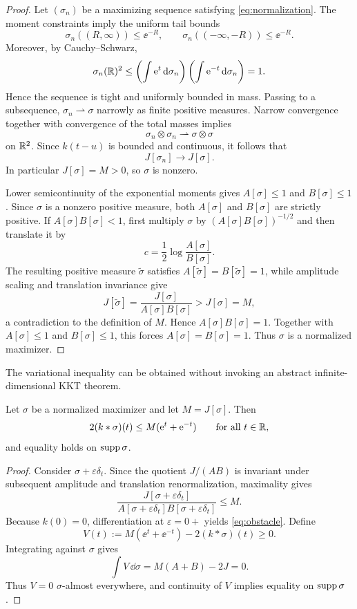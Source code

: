 \begin{proof}
Let $(\sigma_n)$ be a maximizing sequence satisfying \eqref{eq:normalization}.  The moment constraints imply the uniform tail bounds
\[
 \sigma_n((R,\infty))\le \ee^{-R},
 \qquad
 \sigma_n(( -\infty,-R))\le \ee^{-R}.
\]
Moreover, by Cauchy--Schwarz,
\[
 \sigma_n(\mathbb{R})^2
 \le\left(\int\mathrm{e}^t\,\mathrm{d}\sigma_n\right)
 \left(\int\mathrm{e}^{-t}\,\mathrm{d}\sigma_n\right)=1.
\]
Hence the sequence is tight and uniformly bounded in mass.  Passing to a subsequence, $\sigma_n\rightharpoonup\sigma$ narrowly as finite positive measures.  Narrow convergence together with convergence of the total masses implies
\[
 \sigma_n\otimes\sigma_n\rightharpoonup\sigma\otimes\sigma
\]
on $\mathbb{R}^2$.  Since $k(t-u)$ is bounded and continuous, it follows that
\[
 J[\sigma_n]\longrightarrow J[\sigma].
\]
In particular $J[\sigma]=M>0$, so $\sigma$ is nonzero.

Lower semicontinuity of the exponential moments gives $A[\sigma]\le1$ and $B[\sigma]\le1$.  Since $\sigma$ is a nonzero positive measure, both $A[\sigma]$ and $B[\sigma]$ are strictly positive.  If $A[\sigma]B[\sigma]<1$, first multiply $\sigma$ by $(A[\sigma]B[\sigma])^{-1/2}$ and then translate it by
\[
 c=\frac12\log\frac{A[\sigma]}{B[\sigma]}.
\]
The resulting positive measure $\widetilde\sigma$ satisfies $A[\widetilde\sigma]=B[\widetilde\sigma]=1$, while amplitude scaling and translation invariance give
\[
 J[\widetilde\sigma]
 =\frac{J[\sigma]}{A[\sigma]B[\sigma]}
 >J[\sigma]=M,
\]
a contradiction to the definition of $M$.  Hence $A[\sigma]B[\sigma]=1$.  Together with $A[\sigma]\le1$ and $B[\sigma]\le1$, this forces $A[\sigma]=B[\sigma]=1$.  Thus $\sigma$ is a normalized maximizer.
\end{proof}

The variational inequality can be obtained without invoking an abstract infinite-dimensional KKT theorem.

\begin{lemma}
Let $\sigma$ be a normalized maximizer and let $M=J[\sigma]$.  Then
\begin{equation}\label{eq:obstacle}
 2(k*\sigma)(t)\le M(\mathrm{e}^t+\mathrm{e}^{-t})
 \qquad\text{for all }t\in\mathbb{R},
\end{equation}
and equality holds on $\operatorname{supp}\sigma$.
\end{lemma}

\begin{proof}
Consider $\sigma+\varepsilon\delta_t$.  Since the quotient $J/(AB)$ is invariant under subsequent amplitude and translation renormalization, maximality gives
\[
 \frac{J[\sigma+\varepsilon\delta_t]}
 {A[\sigma+\varepsilon\delta_t]B[\sigma+\varepsilon\delta_t]}
 \le M.
\]
Because $k(0)=0$, differentiation at $\varepsilon=0+$ yields \eqref{eq:obstacle}.  Define
\[
 V(t):=M(\ee^t+\ee^{-t})-2(k*\sigma)(t)\ge0.
\]
Integrating against $\sigma$ gives
\[
 \int V\,\dd\sigma=M(A+B)-2J=0.
\]
Thus $V=0$ $\sigma$-almost everywhere, and continuity of $V$ implies equality on $\operatorname{supp}\sigma$.
\end{proof}
